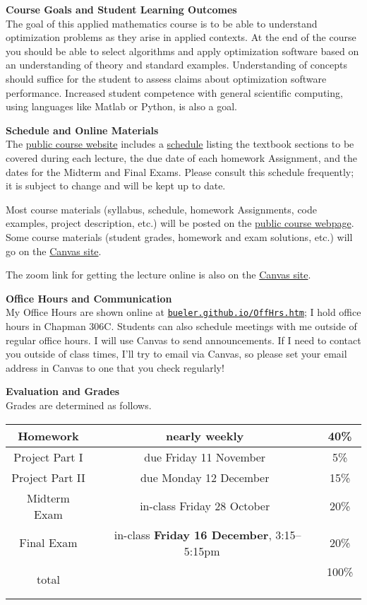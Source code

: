 \documentclass[12pt]{article}
\renewcommand{\emph}[1]{\textsf{\textbf{#1}}}
\newcommand{\localhead}[1]{\par\smallskip\textbf{#1} \smallskip\nobreak\\}%
\def\heading#1{\localhead{\large\emph{#1}}}
\begin{document}
\heading{Course Goals and Student Learning Outcomes}
The goal of this applied mathematics course is to be able to understand optimization problems as they arise in applied contexts.  At the end of the course you should be able to select algorithms and apply optimization software based on an understanding of theory and standard examples.  Understanding of concepts should suffice for the student to assess claims about optimization software performance.  Increased student competence with general scientific computing, using languages like Matlab or Python, is also a goal.


\heading{Schedule and Online Materials}
The \href{https://bueler.github.io/opt/}{public course website} includes a \href{https://bueler.github.io/opt/assets/general/schedule.pdf}{schedule} listing the textbook sections to be covered during each lecture, the due date of each homework Assignment, and the dates for the Midterm and Final Exams.  Please consult this schedule frequently; it is subject to change and will be kept up to date.

Most course materials (syllabus, schedule, homework Assignments, code examples, project description, etc.) will be posted on the \href{https://bueler.github.io/opt/}{public course webpage}.  Some course materials (student grades, homework and exam solutions, etc.) will go on the \href{https://canvas.alaska.edu/courses/9948}{Canvas site}.

The zoom link for getting the lecture online is also on the \href{https://canvas.alaska.edu/courses/9948}{Canvas site}.

\heading{Office Hours and Communication}
My Office Hours are shown online at \href{http://bueler.github.io/OffHrs.htm}{\texttt{bueler.github.io/OffHrs.htm}}; I hold office hours in Chapman 306C.  Students can also schedule meetings with me outside of regular office hours.  I will use Canvas to send announcements.  If I need to contact you outside of class times, I'll try to email via Canvas, so please set your email address in Canvas to one that you check regularly!


\heading{Evaluation and Grades}
Grades are determined as follows.

\begin{tabular}{|c|c|c|}
\hline
Homework & nearly weekly & 40\% \\
\hline
Project Part I & due Friday 11 November & 5\%  \\
\hline
Project Part II & due Monday 12 December & 15\%  \\
\hline
Midterm Exam & in-class Friday 28 October & 20\%  \\
\hline
Final Exam & \, in-class \emph{Friday 16 December}, 3:15--5:15pm \, & 20\% \\
\hline
total & & 100\% \, \\
\hline
\end{tabular}
\end{document}
